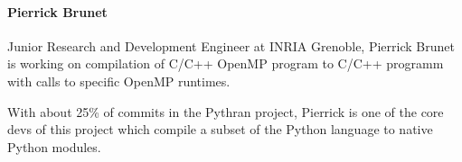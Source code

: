 \paragraph{Pierrick Brunet}


Junior Research and Development Engineer at INRIA Grenoble, Pierrick Brunet
is working on compilation of C/C++ OpenMP program to C/C++ programm with calls
to specific OpenMP runtimes.

With about 25\% of commits in the Pythran project, Pierrick is one of the core
devs of this project which compile a subset of the Python language to native 
Python modules.
